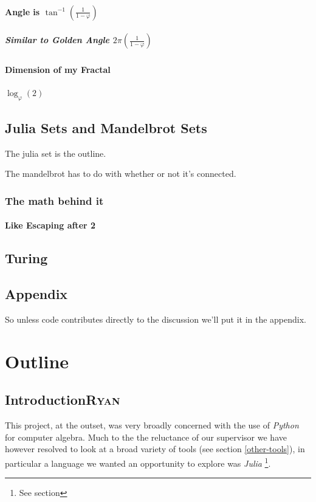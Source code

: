 \documentclass[11pt]{article}
\begin{document}
\paragraph{Angle is \(\tan^{-1}\left( \frac{1}{1-\varphi}\right)\)}
\label{sec:org36c4e92}
\subparagraph{Similar to Golden Angle \(2 \pi \left( \frac{1}{1-\varphi}\right)\)}
\label{sec:org0de29db}
\paragraph{Dimension of my Fractal}
\label{sec:orgc7add56}
\(\log_{\varphi}(2)\)

\subsection{Julia Sets and Mandelbrot Sets}
\label{julia-set}
The julia set is the outline.

The mandelbrot has to do with whether or not it's connected.
\subsubsection{The math behind it}
\label{sec:orgd14c008}
\paragraph{Like Escaping after 2}
\label{sec:org1cf8c9f}
\subsection{Turing}
\label{sec:org79f6459}

\subsection{Appendix}
\label{appendix}
So unless code contributes directly to the discussion we'll put it in the appendix.
\section{Outline}
\label{sec:orga64e085}
\subsection{Introduction\hfill{}\textsc{Ryan}}
\label{sec:orgef05a0b}
This project, at the outset, was very broadly concerned with the use of \emph{Python} for
computer algebra. Much to the the reluctance of our supervisor we have however
resolved to look at a broad variety of tools (see section \ref{other-tools}),
in particular a language we wanted an opportunity to explore was \emph{Julia}
\cite{bezansonJuliaFreshApproach2017} \footnote{See section}.
\end{document}
